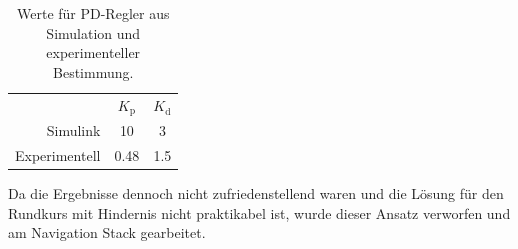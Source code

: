 \begin{table}[h]
	\centering
	\begin{tabular}{rcc}
		 & $K_\text{p}$ & $K_\text{d}$ \\ 
		Simulink & 10 & 3 \\ 
		Experimentell & 0.48 & 1.5
	\end{tabular}
	\caption{Werte f\"ur PD-Regler aus Simulation und experimenteller Bestimmung.}
	\label{tab:PD}
\end{table}

Da die Ergebnisse dennoch nicht zufriedenstellend waren und die L\"osung f\"ur den Rundkurs mit Hindernis nicht praktikabel ist, wurde dieser Ansatz verworfen und am Navigation Stack gearbeitet.
